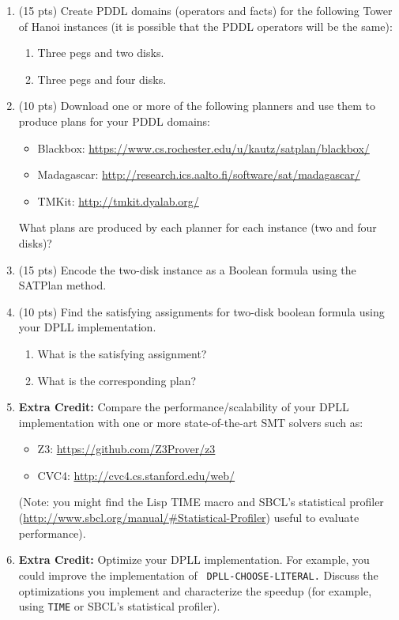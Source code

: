 \documentclass[12pt,letterpaper]{ntdhw}
\begin{document}
\begin{enumerate}
  \item (15 pts) Create PDDL domains (operators and facts) for the following Tower of
  Hanoi instances (it is possible that the PDDL operators will be the
  same):
  \begin{enumerate}
    \item Three pegs and two disks.
    \item Three pegs and four disks.
  \end{enumerate}

  \item (10 pts) Download one or more of the following planners and use them to
  produce plans for your PDDL domains:
  \begin{itemize}
    \item Blackbox:
    \url{https://www.cs.rochester.edu/u/kautz/satplan/blackbox/}
    \item Madagascar:
    \url{http://research.ics.aalto.fi/software/sat/madagascar/}
    \item TMKit:
    \url{http://tmkit.dyalab.org/}
  \end{itemize}
    What plans are produced by each planner for each instance
    (two and four disks)?

    \item (15 pts) Encode the two-disk instance as a Boolean formula using the
    SATPlan method.

    \item (10 pts) Find the satisfying assignments for two-disk boolean
    formula using your DPLL implementation.
    \begin{enumerate}
      \item What is the satisfying assignment?
      \item What is the corresponding plan?
    \end{enumerate}


    \item {\bf Extra Credit:} Compare the performance/scalability of
    your DPLL implementation with one or more state-of-the-art SMT
    solvers such as:
    \begin{itemize}
      \item Z3: \url{https://github.com/Z3Prover/z3}
      \item CVC4: \url{http://cvc4.cs.stanford.edu/web/}
    \end{itemize}
    (Note: you might find the Lisp TIME macro and SBCL's statistical
    profiler (\url{http://www.sbcl.org/manual/#Statistical-Profiler})
    useful to evaluate performance).

    \item {\bf Extra Credit:} Optimize your DPLL implementation.  For
    example, you could improve the implementation of {\tt
      DPLL-CHOOSE-LITERAL.}  Discuss the optimizations you implement
    and characterize the speedup (for example, using {\tt TIME} or
    SBCL's statistical profiler).
\end{enumerate}
\end{document}
